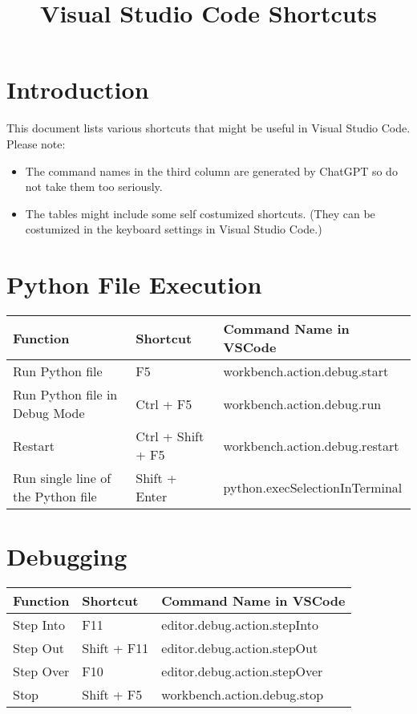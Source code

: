\documentclass{article}
\begin{document}
\title{Visual Studio Code Shortcuts}
\author{}
\date{}

\maketitle

\normalsize
\section*{Introduction}
This document lists various shortcuts that might be useful in Visual Studio Code. Please note:
\begin{itemize}
    \item The command names in the third column are generated by ChatGPT so do not take them too seriously.
    \item The tables might include some self costumized shortcuts. (They can be costumized in the keyboard settings in Visual Studio Code.)
\end{itemize}

\section*{Python File Execution}
\begin{longtable}{|p{6cm}|p{3cm}|p{7cm}|}
\hline
\rowcolor{white}
\textbf{Function} & \textbf{Shortcut} & \textbf{Command Name in VSCode} \\
\hline
Run Python file & F5 & workbench.action.debug.start \\
Run Python file in Debug Mode & Ctrl + F5 & workbench.action.debug.run \\
Restart & Ctrl + Shift + F5 & workbench.action.debug.restart \\
Run single line of the Python file & Shift + Enter & python.execSelectionInTerminal \\
\hline
\end{longtable}

\section*{Debugging}
\begin{longtable}{|p{6cm}|p{3cm}|p{7cm}|}
\hline
\rowcolor{white}
\textbf{Function} & \textbf{Shortcut} & \textbf{Command Name in VSCode} \\
\hline
Step Into & F11 & editor.debug.action.stepInto \\
Step Out & Shift + F11 & editor.debug.action.stepOut \\
Step Over & F10 & editor.debug.action.stepOver \\
Stop & Shift + F5 & workbench.action.debug.stop \\
\hline
\end{longtable}
\end{document}
